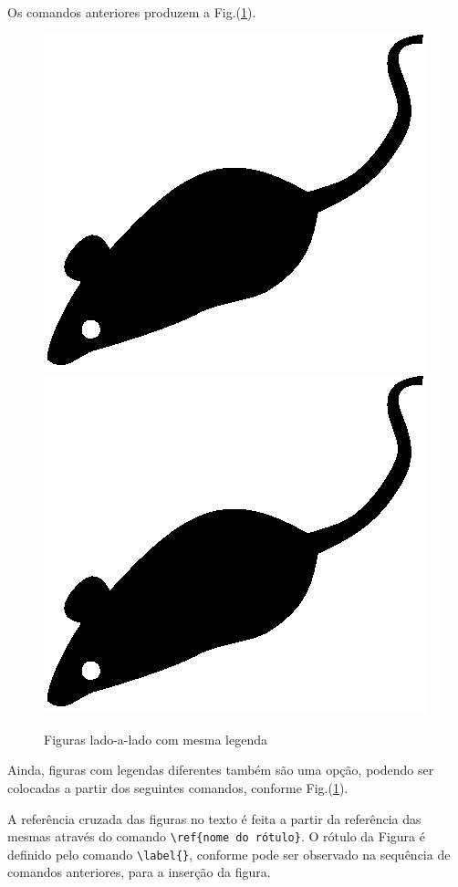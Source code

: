 \documentclass[12pt,A4,A4pt]{article}
\begin{document}
Os comandos anteriores produzem a Fig.(\ref{fig:lado_a_lado}).

\begin{figure}[htbp]
\centering
\includegraphics[scale=0.8]{mouse}
\quad
\includegraphics[scale=0.5]{mouse}
\caption{\fontsize{10pt}{\baselineskip}\selectfont Figuras lado-a-lado com mesma legenda}
\label{fig:lado_a_lado}
\end{figure}


Ainda, figuras com legendas diferentes também são uma opção, podendo ser colocadas a partir dos seguintes comandos, conforme Fig.(\ref{fig:lado_a_lado}).

A referência cruzada das figuras no texto é feita a partir da referência das mesmas através do comando \verb|\ref{nome do rótulo}|. O rótulo da Figura é definido pelo comando \verb|\label{}|, conforme pode ser observado na sequência de comandos anteriores, para a inserção da figura.
\end{document}
